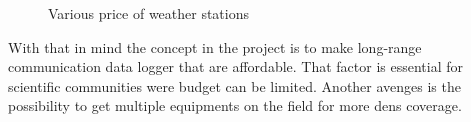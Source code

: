 \begin{figure}[H]
  \centering
  \quad
  \quad
  \quad
  \caption{Various price of weather stations}
  \label{fig:1}
\end{figure}

With that in mind the concept in the project is to make long-range communication data logger that are affordable. That factor is essential for scientific communities were budget can be limited. Another avenges is the possibility to get multiple equipments on the field for more dens coverage. 

